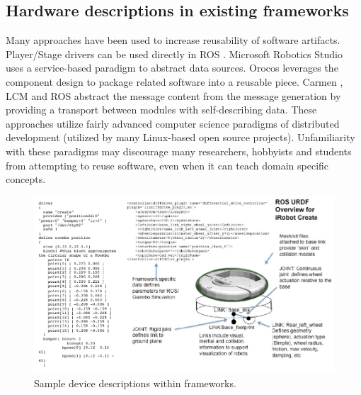 \subsection{Hardware descriptions in existing frameworks}
Many approaches have been used to increase reusability of software artifacts.  Player/Stage drivers can be used directly in ROS \cite{quigley2009}.  Microsoft Robotics Studio uses a service-based paradigm to abstract data sources.  Orocos \cite{Bruyninckx2001} leverages the component design to package related software into a reusable piece.  Carmen \cite{Montemerlo2003}, LCM \cite{Huang2009} and ROS \cite{quigley2009} abstract the message content from the message generation by providing a transport between modules with self-describing data.  These approaches utilize fairly advanced computer science paradigms of distributed development (utilized by many Linux-based open source projects).  Unfamiliarity with these paradigms may discourage many researchers, hobbyists and students from attempting to reuse software, even when it can teach domain specific concepts.

\begin{figure}[thpb]
      \centering
      \includegraphics[width=5in]{URDFPS.pdf}
      \caption{Sample device descriptions within frameworks.}
      \label{psurdf}
\end{figure}



